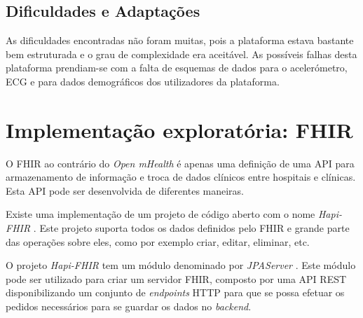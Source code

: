 \subsection{Dificuldades e Adaptações}

As dificuldades encontradas não foram muitas, pois a plataforma estava bastante bem estruturada e o grau de complexidade era aceitável. As possíveis falhas desta plataforma prendiam-se com a falta de esquemas de dados para o acelerómetro, \gls{ECG} e para dados demográficos dos utilizadores da plataforma.

\section{Implementação exploratória: FHIR}
O \gls{FHIR} ao contrário do \textit{Open mHealth} é apenas uma definição de uma \gls{API} para armazenamento de informação e troca de dados clínicos entre hospitais e clínicas. Esta \gls{API} pode ser desenvolvida de diferentes maneiras. \par 
Existe uma implementação de um projeto de código aberto com o nome \textit{Hapi-FHIR} \cite{hapi-index}. Este projeto suporta todos os dados definidos pelo \gls{FHIR} e grande parte das operações sobre eles, como por exemplo criar, editar, eliminar, etc.
\par 
O projeto \textit{Hapi-FHIR} tem um módulo denominado por \textit{JPAServer}  \cite{jpa-server}. Este módulo pode ser utilizado para criar um servidor \gls{FHIR}, composto por uma \gls{API} \gls{REST} disponibilizando um conjunto de \textit{endpoints} \gls{HTTP} para que se possa efetuar os pedidos necessários para se guardar os dados no \textit{backend}. \par

